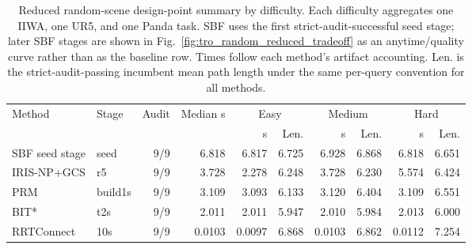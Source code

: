 \begin{table}[t]
\centering
\caption{Reduced random-scene design-point summary by difficulty. Each difficulty aggregates one IIWA, one UR5, and one Panda task. SBF uses the first strict-audit-successful seed stage; later SBF stages are shown in Fig.~\ref{fig:tro_random_reduced_tradeoff} as an anytime/quality curve rather than as the baseline row. Times follow each method's artifact accounting. Len. is the strict-audit-passing incumbent mean path length under the same per-query convention for all methods.}
\label{tab:tro_random_reduced}
\footnotesize
\setlength{\tabcolsep}{3.0pt}
\begin{tabular}{llrr|rr|rr|rr}
\toprule
Method & Stage & Audit & Median s & \multicolumn{2}{c|}{Easy} & \multicolumn{2}{c|}{Medium} & \multicolumn{2}{c}{Hard} \\
 & & & & s & Len. & s & Len. & s & Len. \\
\midrule
SBF seed stage & seed & 9/9 & 6.818 & 6.817 & 6.725 & 6.928 & 6.868 & 6.818 & 6.651 \\
IRIS-NP+GCS & r5 & 9/9 & 3.728 & 2.278 & 6.248 & 3.728 & 6.230 & 5.574 & 6.424 \\
PRM & build1s & 9/9 & 3.109 & 3.093 & 6.133 & 3.120 & 6.404 & 3.109 & 6.551 \\
BIT* & t2s & 9/9 & 2.011 & 2.011 & 5.947 & 2.010 & 5.984 & 2.013 & 6.000 \\
RRTConnect & 10s & 9/9 & 0.0103 & 0.0097 & 6.868 & 0.0103 & 6.862 & 0.0112 & 7.254 \\
\bottomrule
\end{tabular}
\end{table}
